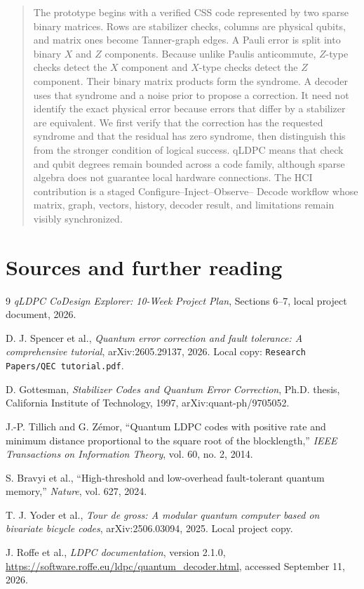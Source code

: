 \documentclass[11pt]{article}
\begin{document}
\begin{quote}\small
The prototype begins with a verified CSS code represented by two sparse binary matrices. Rows are
stabilizer checks, columns are physical qubits, and matrix ones become Tanner-graph edges. A Pauli
error is split into binary \(X\) and \(Z\) components. Because unlike Paulis anticommute, \(Z\)-type
checks detect the \(X\) component and \(X\)-type checks detect the \(Z\) component. Their binary
matrix products form the syndrome. A decoder uses that syndrome and a noise prior to propose a
correction. It need not identify the exact physical error because errors that differ by a stabilizer
are equivalent. We first verify that the correction has the requested syndrome and that the residual
has zero syndrome, then distinguish this from the stronger condition of logical success. qLDPC means
that check and qubit degrees remain bounded across a code family, although sparse algebra does not
guarantee local hardware connections. The HCI contribution is a staged Configure--Inject--Observe--
Decode workflow whose matrix, graph, vectors, history, decoder result, and limitations remain visibly
synchronized.
\end{quote}

\section{Sources and further reading}

\begin{thebibliography}{9}
\emph{qLDPC CoDesign Explorer: 10-Week Project Plan}, Sections 6--7, local project document, 2026.

D. J. Spencer et al., \emph{Quantum error correction and fault tolerance: A comprehensive tutorial},
arXiv:2605.29137, 2026. Local copy: \texttt{Research Papers/QEC tutorial.pdf}.

D. Gottesman, \emph{Stabilizer Codes and Quantum Error Correction}, Ph.D. thesis,
California Institute of Technology, 1997, arXiv:quant-ph/9705052.

J.-P. Tillich and G. Z\'emor, ``Quantum LDPC codes with positive rate and minimum distance
proportional to the square root of the blocklength,'' \emph{IEEE Transactions on Information Theory},
vol. 60, no. 2, 2014.

S. Bravyi et al., ``High-threshold and low-overhead fault-tolerant quantum memory,''
\emph{Nature}, vol. 627, 2024.

T. J. Yoder et al., \emph{Tour de gross: A modular quantum computer based on bivariate bicycle
codes}, arXiv:2506.03094, 2025. Local project copy.

J. Roffe et al., \emph{LDPC documentation}, version 2.1.0,
\url{https://software.roffe.eu/ldpc/quantum_decoder.html}, accessed September 11, 2026.
\end{thebibliography}
\end{document}
